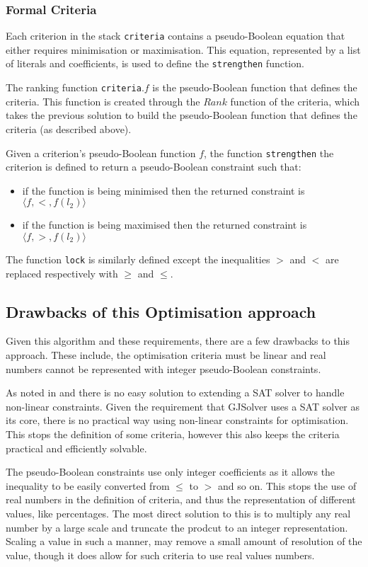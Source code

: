 \subsubsection{Formal Criteria}
Each criterion in the stack \verb+criteria+ contains a pseudo-Boolean equation that either requires minimisation or maximisation.
This equation, represented by a list of literals and coefficients, is used to define the \verb+strengthen+ function.

The ranking function \verb+criteria+.$f$ is the pseudo-Boolean function that defines the criteria.
This function is created through the $Rank$ function of the criteria, which takes the previous solution to build the pseudo-Boolean function that defines the criteria (as described above).

Given a criterion's pseudo-Boolean function $f$,
the function \verb+strengthen+ the criterion is defined to return a pseudo-Boolean constraint such that:
\begin{itemize}
  \item if the function is being minimised then the returned constraint is $\langle f,<,f(l_2) \rangle$
  \item if the function is being maximised then the returned constraint is $\langle f,>,f(l_2) \rangle$
\end{itemize}
The function \verb+lock+ is similarly defined except the inequalities $>$ and $<$ are replaced respectively with $\geq$ and $\leq$.

\subsection{Drawbacks of this Optimisation approach}
Given this algorithm and these requirements, there are a few drawbacks to this approach.
These include, the optimisation criteria must be linear and real numbers cannot be represented with integer pseudo-Boolean constraints.

As noted in \cite{le_berre_dependency_2009} and \cite{leBerre2010} there is no easy solution to extending a SAT solver to handle non-linear constraints.
Given the requirement that GJSolver uses a SAT solver as its core, there is no practical way using non-linear constraints for optimisation.
This stops the definition of some criteria, however this also keeps the criteria practical and efficiently solvable.   

The pseudo-Boolean constraints use only integer coefficients as it allows the inequality to be easily converted from $\leq$ to $>$ and so on.
This stops the use of real numbers in the definition of criteria, and thus the representation of different values, like percentages.
The most direct solution to this is to multiply any real number by a large scale and truncate the prodcut to an integer representation.
Scaling a value in such a manner, may remove a small amount of resolution of the value, though it does allow for such criteria to use real values numbers.

